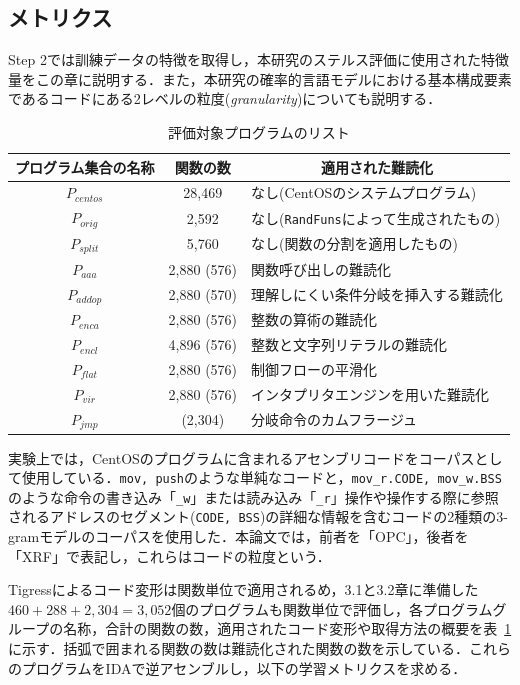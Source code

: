 \documentclass[12pt]{jarticle}
\newcommand\doubleRule{\toprule\toprule}
\begin{document}
\subsection{メトリクス} \label{sub:metrics}
Step 2では訓練データの特徴を取得し，本研究のステルス評価に使用された特徴量をこの章に説明する．また，本研究の確率的言語モデルにおける基本構成要素であるコードにある2レベルの粒度(\textit{granularity})についても説明する．

\begin{table}[!b]
\centering
\caption{評価対象プログラムのリスト}
\label{table:proglist}
\begin{tabular}[t]{c|c|l}
\doubleRule
\textbf{プログラム集合の名称} & \textbf{関数の数} & \multicolumn{1}{c}{\textbf{適用された難読化}}\\
\hline
$P_{centos}$ & 28,469 & なし(CentOSのシステムプログラム) \\
$P_{orig}$ & 2,592 & なし(\texttt{RandFuns}によって生成されたもの) \\
$P_{split}$ & 5,760 & なし(関数の分割を適用したもの) \\\hline
$P_{aaa}$ & 2,880 (576) & 関数呼び出しの難読化 \\
$P_{addop}$ & 2,880 (570) & 理解しにくい条件分岐を挿入する難読化 \\
$P_{enca}$ & 2,880 (576) & 整数の算術の難読化 \\
$P_{encl}$ & 4,896 (576) & 整数と文字列リテラルの難読化 \\
$P_{flat}$ & 2,880 (576) & 制御フローの平滑化 \\
$P_{vir}$ & 2,880 (576) & インタプリタエンジンを用いた難読化 \\
$P_{jmp}$ & (2,304) & 分岐命令のカムフラージュ \\
\bottomrule
\end{tabular}
\end{table}

実験上では，CentOSのプログラムに含まれるアセンブリコードをコーパスとして使用している．\texttt{mov, push}のような単純なコードと，\texttt{mov\_r.CODE, mov\_w.BSS}のような命令の書き込み「\texttt{\_w}」または読み込み「\texttt{\_r}」操作や操作する際に参照されるアドレスのセグメント(\texttt{CODE, BSS})の詳細な情報を含むコードの2種類の3-gramモデルのコーパスを使用した．本論文では，前者を「OPC」，後者を「XRF」で表記し，これらはコードの粒度という．

Tigressによるコード変形は関数単位で適用されるめ，3.1と3.2章に準備した$460+288+2,304=3,052$個のプログラムも関数単位で評価し，各プログラムグループの名称，合計の関数の数，適用されたコード変形や取得方法の概要を表~\ref{table:proglist}に示す．括弧で囲まれる関数の数は難読化された関数の数を示している．これらのプログラムをIDAで逆アセンブルし，以下の学習メトリクスを求める．
\end{document}
